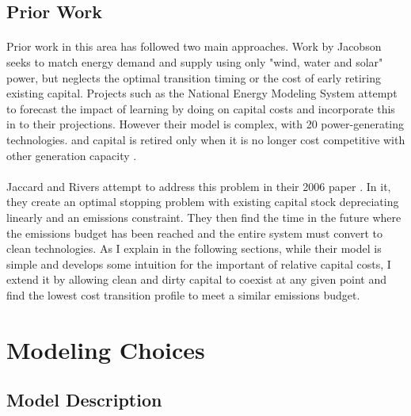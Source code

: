 \documentclass{article}
\begin{document}
\subsection{Prior Work}

\paragraph{} Prior work in this area has followed two main approaches. Work by Jacobson \cite{Jacobson} seeks to match energy demand and supply using only "wind, water and solar" power, but neglects the optimal transition timing or the cost of early retiring existing capital. Projects such as the National Energy Modeling System attempt to forecast the impact of learning by doing on capital costs and incorporate this in to their projections. However their model is complex, with 20 power-generating technologies. and capital is retired only when it is no longer cost competitive with other generation capacity \cite{NEMS}. 

\paragraph{} Jaccard and Rivers attempt to address this problem in their 2006 paper \cite{JR2006}. In it, they create an optimal stopping problem with existing capital stock depreciating linearly and an emissions constraint. They then find the time in the future where the emissions budget has been reached and the entire system must convert to clean technologies. As I explain in the following sections, while their model is simple and develops some intuition for the important of relative capital costs, I extend it by allowing clean and dirty capital to coexist at any given point and find the lowest cost transition profile to meet a similar emissions budget. 




\section{Modeling Choices}
\subsection{Model Description}\label{sec:ModelDesc}
\end{document}
